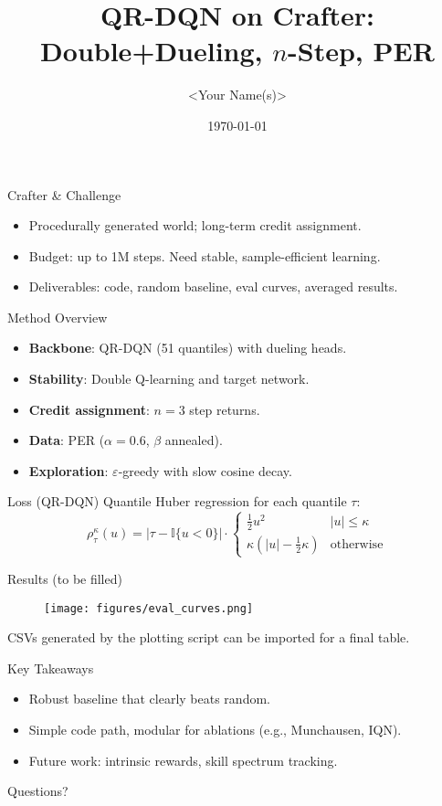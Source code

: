 \documentclass{beamer}
\title[QR-DQN on Crafter]{QR-DQN on Crafter:\\Double+Dueling, $n$-Step, PER}
\author{<Your Name(s)>}
\institute{UPB -- Advanced Topics in AI}
\date{\today}
\begin{document}
\begin{frame}
  \titlepage
\end{frame}

\begin{frame}{Crafter \& Challenge}
  \begin{itemize}
    \item Procedurally generated world; long-term credit assignment.
    \item Budget: up to 1M steps. Need stable, sample-efficient learning.
    \item Deliverables: code, random baseline, eval curves, averaged results.
  \end{itemize}
\end{frame}

\begin{frame}{Method Overview}
  \begin{itemize}
    \item \textbf{Backbone}: QR-DQN (51 quantiles) with dueling heads.
    \item \textbf{Stability}: Double Q-learning and target network.
    \item \textbf{Credit assignment}: $n{=}3$ step returns.
    \item \textbf{Data}: PER ($\alpha=0.6$, $\beta$ annealed).
    \item \textbf{Exploration}: $\varepsilon$-greedy with slow cosine decay.
  \end{itemize}
\end{frame}

\begin{frame}{Loss (QR-DQN)}
Quantile Huber regression for each quantile $\tau$:
\[
\rho_\tau^\kappa(u) =
|\tau - \mathbb{I}\{u<0\}| \cdot
\begin{cases}
\frac{1}{2}u^2 & |u|\le \kappa\\
\kappa(|u| - \frac{1}{2}\kappa) & \text{otherwise}
\end{cases}
\]
\end{frame}

\begin{frame}{Results (to be filled)}
\begin{figure}
\texttt{[image: figures/eval\_curves.png]}
\end{figure}
\small CSVs generated by the plotting script can be imported for a final table.
\end{frame}

\begin{frame}{Key Takeaways}
  \begin{itemize}
    \item Robust baseline that clearly beats random.
    \item Simple code path, modular for ablations (e.g., Munchausen, IQN).
    \item Future work: intrinsic rewards, skill spectrum tracking.
  \end{itemize}
\end{frame}

\begin{frame}
  \centering \Large Questions?
\end{frame}
\end{document}
